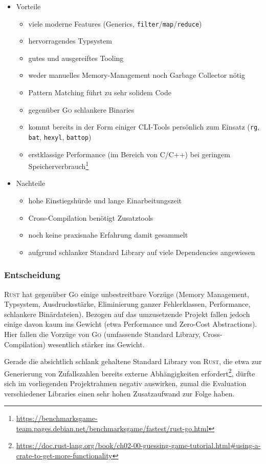 \begin{itemize}
	\item Vorteile
		\begin{itemize}
			\item viele moderne Features (Generics, \texttt{filter}/\texttt{map}/\texttt{reduce})
			\item hervorragendes Typsystem
			\item gutes und ausgereiftes Tooling
			\item weder manuelles Memory-Management noch Garbage Collector nötig
			\item Pattern Matching führt zu sehr solidem Code
			\item gegenüber \textsc{Go} schlankere Binaries
			\item kommt bereits in der Form einiger CLI-Tools persönlich zum Einsatz (\texttt{rg}, \texttt{bat}, \texttt{hexyl}, \texttt{battop})
			\item erstklassige Performance (im Bereich von C/C++) bei geringem Speicherverbrauch\footnote{\url{https://benchmarksgame-team.pages.debian.net/benchmarksgame/fastest/rust-go.html}}
		\end{itemize}
	\item Nachteile
		\begin{itemize}
			\item hohe Einstiegshürde und lange Einarbeitungszeit
			\item Cross-Compilation benötigt Zusatztools
			\item noch keine praxisnahe Erfahrung damit gesammelt
			\item aufgrund schlanker Standard Library auf viele Dependencies angewiesen
		\end{itemize}
\end{itemize}

\subsubsection{Entscheidung}

\textsc{Rust} hat gegenüber \textsc{Go} einige unbestreitbare Vorzüge (Memory Management, Typsystem, Ausdrucksstärke, Eliminierung ganzer Fehlerklassen, Performance, schlankere Binärdateien). Bezogen auf das umzusetzende Projekt fallen jedoch einige davon kaum ins Gewicht (etwa Performance und Zero-Cost Abstractions). Hier fallen die Vorzüge von \textsc{Go} (umfassende Standard Library, Cross-Compilation) wesentlich stärker ins Gewicht.

Gerade die absichtlich schlank gehaltene Standard Library von \textsc{Rust}, die etwa zur Generierung von Zufallszahlen bereits externe Abhängigkeiten erfordert\footnote{\url{https://doc.rust-lang.org/book/ch02-00-guessing-game-tutorial.html\#using-a-crate-to-get-more-functionality}}, dürfte sich im vorliegenden Projektrahmen negativ auswirken, zumal die Evaluation verschiedener Libraries einen sehr hohen Zusatzaufwand zur Folge haben.

